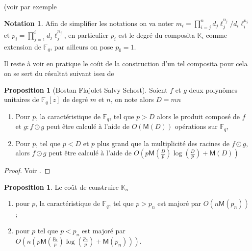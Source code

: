 \documentclass[10pt,a4paper]{book}
\theoremstyle{plain}
\theoremstyle{definition}
\theoremstyle{definition}
\theoremstyle{definition}
\newtheorem{prop}[thm]{Proposition}
\theoremstyle{definition}
\theoremstyle{remark}
\theoremstyle{remark}
\theoremstyle{definition}
\newtheorem{nota}[thm]{Notation}
\begin{document}
(voir par exemple 
\begin{nota} Afin de simplifier les notations on va 
 noter $m_i=\prod_{i=j}^nd_j\ell_j^{n_j}/d_i\ell_i^{n_i}$ et 
 $p_{i}=\prod_{j=1}^{i}d_j\ell_j^{n_j}$, en particulier $p_{i}$ est le 
 degré du composita $\mathbb{K}_i$ comme extension de $\mathbb{F}_q$, par 
 ailleurs on pose $p_0=1$.
\end{nota}

Il reste à voir en pratique le coût de la construction d'un tel composita pour 
cela on se sert du résultat suivant issu de \cite[Theorem 1]{BostanFlajoletSalvySchost06}

\begin{prop}[Bostan Flajolet Salvy Schost]
\label{pro:comp:prod}
Soient $f$ et $g$ deux polynômes unitaires de $\mathbb{F}_q[z]$ de degré $m$ et $n$, on note alors $D=mn$
\begin{enumerate}
\item Pour $p$, la caractéristique de $\mathbb{F}_q$, tel que $p>D$ alors le produit composé de $f$ et $g: f \odot g$ peut être calculé à l'aide de  $O(\mathsf{M}(D))$ opérations sur $\mathbb{F}_q$,
\item Pour $p$, tel que $p<D$ et $p$ plus grand que la multiplicité des racines de $f \odot g$, alors $f \odot g$ peut être calculé à l'aide de $O(p\mathsf{M}(\frac{D}{p})\log(\frac{D}{p})+\mathsf{M}(D))$
\end{enumerate}
\end{prop}

\begin{proof}
Voir \cite{BostanFlajoletSalvySchost06}.
\end{proof}

\begin{prop}
\label{pro:con:comp}
Le coût de construire $\mathbb{K}_n$
\begin{enumerate}
\item pour $p$, la caractéristique de $\mathbb{F}_q$, tel que $p>p_n$
est majoré par $O(n\mathsf{M}(p_n))$;
\item pour $p$ tel que $p<p_n$ est majoré par 
$O(n(p\mathsf{M}(\frac{p_n}{p})\log(\frac{p_n}{p})+\mathsf{M}(p_n)))$.
\end{enumerate}
\end{prop}
\end{document}
